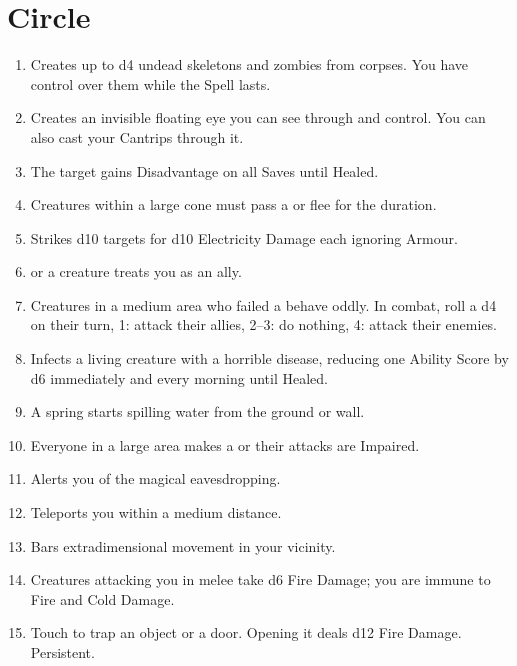 \documentclass[itdr/core]{subfiles}
\begin{document}

\vfill
\break

\section{ Circle}
\def \spellcircle {4}
\begin{enumerate}
	\item {} Creates up to d4 undead skeletons and zombies from corpses. You have \mbox{control} over them while the Spell lasts.
	\item {} Creates an invisible floating eye you can see through and control. You can also cast your Cantrips through it.
	\item {} The target gains Disadvantage on all Saves until Healed.
	\item {} Creatures within a large cone must pass a  or flee for the duration.
	\item {} Strikes d10 targets for d10 Electricity Damage each ignoring Armour.
	\item {}  or a creature treats you as an ally.
	\item {} Creatures in a medium area who failed a  behave oddly. In combat, roll a d4 on their turn, 1: attack their allies, 2--3: do nothing, 4: attack their enemies.
	\item {} Infects a living creature with a horrible disease, reducing one Ability Score by d6 immediately and every morning until Healed.
	\item {} A spring starts spilling water from the ground or wall.
	\item {} Everyone in a large area makes a  or their attacks are Impaired.
	\item {} Alerts you of the magical eavesdropping.
	\item {} Teleports you within a medium distance.
	\item {} Bars extradimensional movement in your vicinity.
	\item {} Creatures attacking you in melee take d6 Fire Damage; you are immune to Fire and Cold Damage.
	\item {} Touch to trap an object or a door. Opening it deals d12 Fire Damage. Persistent.

\end{enumerate}
\end{document}
